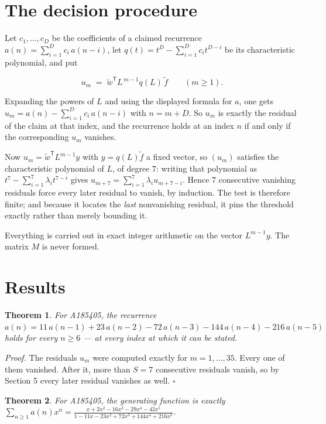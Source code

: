 \documentclass[11pt]{article}
\newtheorem{theorem}{Theorem}
\theoremstyle{definition}
\begin{document}
\section{The decision procedure}

Let $c_1,\dots,c_D$ be the coefficients of a claimed recurrence $a(n) = \sum_{i=1}^{D} c_i\,a(n-i)$, let $q(t) = t^{D} - \sum_{i=1}^{D} c_i t^{D-i}$ be its characteristic polynomial, and put

\[u_m \;=\; \tilde w^{\mathsf T} L^{\,m-1} q(L)\,\tilde f \qquad (m \ge 1).\]

Expanding the powers of $L$ and using the displayed formula for $a$, one gets $u_m = a(n) - \sum_{i=1}^{D} c_i\,a(n-i)$ with $n = m + D$. So $u_m$ is exactly the residual of the claim at that index, and the recurrence holds at an index $n$ if and only if the corresponding $u_m$ vanishes.

Now $u_m = \tilde w^{\mathsf T} L^{m-1} y$ with $y = q(L)\tilde f$ a fixed vector, so $(u_m)$ satisfies the characteristic polynomial of $L$, of degree $7$: writing that polynomial as $t^{7} - \sum_{i=1}^{7} \lambda_i t^{7-i}$ gives $u_{m+7} = \sum_{i=1}^{7} \lambda_i u_{m+7-i}$. Hence $7$ consecutive vanishing residuals force every later residual to vanish, by induction. The test is therefore finite; and because it locates the {\itshape last} nonvanishing residual, it pins the threshold exactly rather than merely bounding it.

Everything is carried out in exact integer arithmetic on the vector $L^{m-1}y$. The matrix $M$ is never formed.

\section{Results}

\begin{theorem} For A185405, the recurrence $a(n) = 11\,a(n-1) + 23\,a(n-2) - 72\,a(n-3) - 144\,a(n-4) - 216\,a(n-5)$ holds for every $n \ge 6$ --- at every index at which it can be stated.\end{theorem}

{\itshape Proof.} The residuals $u_m$ were computed exactly for $m = 1,\dots,35$. Every one of them vanished. After it, more than $S = 7$ consecutive residuals vanish, so by Section 5 every later residual vanishes as well. $\square$

\begin{theorem} For A185405, the generating function is exactly $\sum_{n\ge 1} a(n)x^n = \frac{x + 2x^{2} - 16x^{3} - 29x^{4} - 42x^{5}}{1 - 11x - 23x^{2} + 72x^{3} + 144x^{4} + 216x^{5}}$.\end{theorem}
\end{document}
